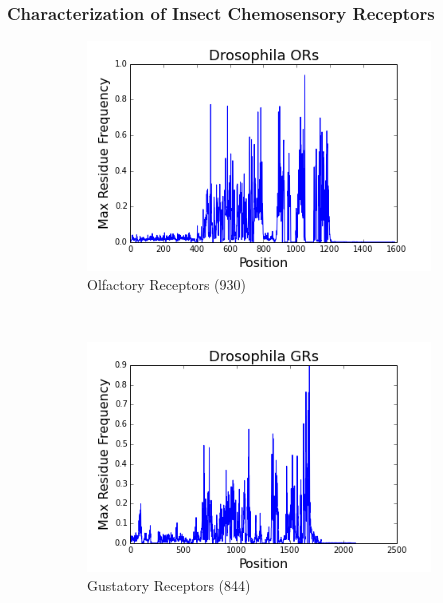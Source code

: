 \subsubsection{Characterization of Insect Chemosensory Receptors}

\begin{figure}[H]
  \centering
  \begin{subfigure}[b]{0.45\textwidth}
    \includegraphics[width=\textwidth]{figures/chemosensory/drosophila_or_max_freq.png}
    \caption{Olfactory Receptors (930)}
    \label{fig:chemosensory:or-max-freq}
  \end{subfigure}
  ~
  \begin{subfigure}[b]{0.45\textwidth}
    \includegraphics[width=\textwidth]{figures/chemosensory/drosophila_gr_max_freq.png}
    \caption{Gustatory Receptors (844)}
    \label{fig:chemosensory:gr-max-freq}
  \end{subfigure}
\label{fig:chemosensory:max-freq}
\caption{}
\end{figure}


